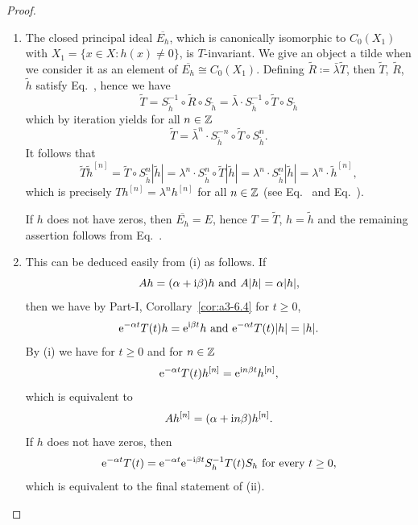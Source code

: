 \begin{proof}
\begin{enumerate}	
\item
The closed principal ideal $\overline{E_{h}}$, which is canonically isomorphic to $C_{0}(X_{1})$ with $X_{1} = \{x \in X \colon h(x) \neq 0\}$, is $T$-invariant.
	We give an object a tilde when we consider it as an element of\/ $\overline{E_{h}} \cong C_{0}(X_{1})$.
	Defining $\tilde{R} \coloneq \bar{\lambda}\tilde{T}$, then $\tilde{T}$, $\tilde{R}$, $\tilde{h}$ satisfy Eq.~, hence we have
	\begin{equation}\label{eq:b3-2.12}
		\tilde{T} = S_{\tilde{h}}^{-1} \circ \tilde{R} \circ S_{\tilde{h}} = \bar{\lambda} \cdot S_{\tilde{h}}^{-1} \circ \tilde{T} \circ S_{\tilde{h}}
	\end{equation}
	which by iteration yields for all $ n \in \mathbb{Z} $
	\begin{equation}\label{eq:b3-2.13}
		\tilde{T} = \bar{\lambda}^{n} \cdot S_{\tilde{h}}^{-n} \circ \tilde{T} \circ S_{\tilde{h}}^{n} .
	\end{equation}
	It follows that
		\begin{equation*}
		\tilde{T}\tilde{h}^{[n]} = \tilde{T} \circ S_{\tilde{h}}^{n}|\tilde{h}| = \lambda^{n} \cdot S_{\tilde{h}}^{n} \circ \tilde{T}|\tilde{h}| 
		= \lambda^{n} \cdot S_{\tilde{h}}^{n}|\tilde{h}| = \lambda^{n} \cdot \tilde{h}^{[n]} , 
	\end{equation*}
	which is precisely $Th^{[n]} = \lambda^{n}h^{[n]}$ for all $n \in \mathbb{Z}$ (see Eq.~ and Eq.~). 
	
	If\/ $h$ does not have zeros, then $\overline{E_{h}} = E$, hence $T = \tilde{T}$, $h = \tilde{h}$ and the remaining assertion follows from Eq.~.

\item 
    This can be deduced easily from (i) as follows. If
    \[
    Ah = (\alpha+\mathrm{i}\beta )h \text{ and } A|h| = \alpha|h| , 
    \] 
    then we have by Part-I, Corollary~\ref{cor:a3-6.4}  for $ t \geq 0$,
	\[
	\mathrm{e}^{-\alpha t}T(t)h = \mathrm{e}^{\mathrm{i}\beta  t} h \text{ and } \mathrm{e}^{-\alpha t}T(t)|h| = |h| .
	\]
	By (i) we have for $t \geq 0 $ and for $n \in \mathbb{Z}$ 
    \[\mathrm{e}^{-\alpha t}T(t)h^{[n]} = \mathrm{e}^{\mathrm{i} n\beta t}h^{[n]} ,  
    \] 
    which is equivalent to 
    \[ 
    Ah^{[n]} = (\alpha+\mathrm{i} n\beta)h^{[n]} .
    \] 
	If\/ $h$ does not have zeros, then 
    \[
    \eu^{-\alpha t}T(t) = \eu^{-\alpha t}\eu^{-\im\beta t}S_{h}^{-1}T(t)S_{h} \text{ for every } t \geq 0 , 
    \] 
    which is equivalent to the final statement of (ii).
    \qedhere
    \end{enumerate}
\end{proof}
